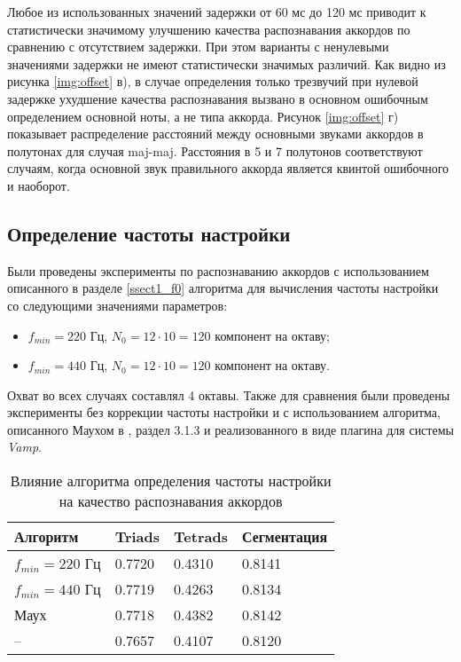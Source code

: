 Любое из использованных значений задержки от 60 мс до 120 мс приводит к
статистически значимому улучшению качества распознавания аккордов по сравнению
с отсутствием задержки. При этом варианты с ненулевыми значениями задержки не
имеют статистически значимых различий. Как видно из рисунка \ref{img:offset} в),
в случае определения только трезвучий при нулевой задержке ухудшение качества
распознавания вызвано в основном ошибочным определением основной ноты, а не
типа аккорда. Рисунок \ref{img:offset} г) показывает распределение расстояний
между основными звуками аккордов в полутонах для случая maj-maj. Расстояния в 5
и 7 полутонов соответствуют случаям, когда основной звук правильного аккорда
является квинтой ошибочного и наоборот.

\subsection{Определение частоты настройки} \label{ssec3_tunfreq}

Были проведены эксперименты по распознаванию аккордов с использованием
описанного в разделе \ref{ssect1_f0} алгоритма для вычисления частоты настройки
со следующими значениями параметров:
\begin{itemize}
  \item $f_{min} = 220$ Гц, $N_0 = 12 \cdot 10 = 120$ компонент на октаву;
  \item $f_{min} = 440$ Гц, $N_0 = 12 \cdot 10 = 120$ компонент на октаву.
\end{itemize}
Охват во всех случаях составлял 4 октавы. Также для сравнения были проведены
эксперименты без коррекции частоты настройки и с использованием алгоритма,
описанного Маухом в \cite{MauchThesis2010}, раздел 3.1.3 и реализованного в виде
плагина для системы \emph{Vamp}.

\begin{table} [htbp]
  \centering
  \parbox{15cm}{\caption{Влияние алгоритма определения частоты настройки на
  качество распознавания аккордов} \label{TTunFreq}}
  \begin{tabular}{|l|l|l|l|}
  \hline
  Алгоритм & Triads & Tetrads & Сегментация \\
  \hline
  $f_{min} = 220$ Гц & 0.7720 & 0.4310 & 0.8141 \\
  $f_{min} = 440$ Гц & 0.7719 & 0.4263 & 0.8134 \\
  Маух \cite{MauchThesis2010} & 0.7718 & 0.4382 & 0.8142 \\
  -- & 0.7657 & 0.4107 & 0.8120 \\
  \hline
  \end{tabular}
\end{table}

